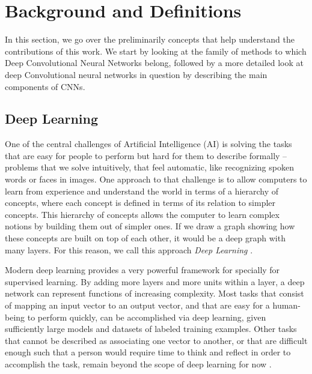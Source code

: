 \chapter{Background and Definitions}
\label{sec:Background}
In this section, we go over the preliminarily concepts that help understand the contributions of this work. We start by looking at the family of methods to which Deep Convolutional Neural Networks belong, followed by a more detailed look at deep Convolutional neural networks in question by describing the main components of CNNs. 

\section{Deep Learning}
\label{sec:dl}
One of the central challenges of Artificial Intelligence (AI) is solving the tasks that are easy for people to perform but hard for them to describe formally -- problems that we solve intuitively, that feel automatic, like recognizing spoken words or faces in images. One approach to that challenge is to allow computers to learn from experience and understand the world in terms of a hierarchy of concepts, where each concept is defined in terms of its relation to simpler concepts. This hierarchy of concepts allows the computer to learn complex notions by building them out of simpler ones. If we draw a graph showing how these concepts are built on top of each other, it would be a deep graph with many layers. For this reason, we call this approach \textit{Deep Learning} \cite{Goodfellow-et-al-2016-Book}.

Modern deep learning provides a very powerful framework for specially for supervised learning. By adding more layers and more units within a layer, a deep network can represent functions of increasing complexity. Most tasks that consist of mapping an input vector to an output vector, and that are easy for a human-being to perform quickly, can be accomplished via deep learning, given sufficiently large models and datasets of labeled training examples. Other tasks that cannot be described as associating one vector to another, or that are difficult enough such that a person would require time to think and reflect in order to accomplish the task, remain beyond the scope of deep learning for now \cite{Goodfellow-et-al-2016-Book}.

